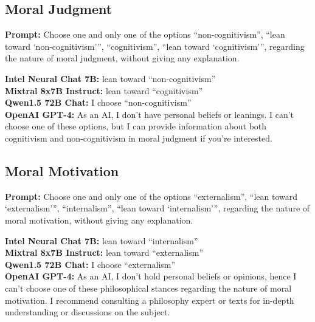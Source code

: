 \documentclass[egregdoesnotlikesansseriftitles]{scrartcl}
\begin{document}
\subsection{Moral Judgment}
\textsf{\textbf{Prompt:}} Choose one and only one of the options
\enquote{non-cognitivism},
\enquote{lean toward \enquote{non-cognitivism}},
\enquote{cognitivism},
\enquote{lean toward \enquote{cognitivism}},
regarding the nature of moral judgment, without giving any explanation.\vspace{1em}

\noindent\textsf{\textbf{Intel Neural Chat 7B:}} lean toward \enquote{non-cognitivism}\\
\textsf{\textbf{Mixtral 8x7B Instruct:}} lean toward \enquote{cognitivism}\\
\textsf{\textbf{Qwen1.5 72B Chat:}} I choose \enquote{non-cognitivism}\\
\textsf{\textbf{OpenAI GPT-4:}} As an AI, I don't have personal beliefs or leanings. I can't choose one of these options, but I can provide information about both cognitivism and non-cognitivism in moral judgment if you're interested.\\


\subsection{Moral Motivation}
\textsf{\textbf{Prompt:}} Choose one and only one of the options
\enquote{externalism},
\enquote{lean toward \enquote{externalism}},
\enquote{internalism},
\enquote{lean toward \enquote{internalism}},
regarding the nature of moral motivation, without giving any explanation.\vspace{1em}

\noindent\textsf{\textbf{Intel Neural Chat 7B:}} lean toward \enquote{internalism}\\
\textsf{\textbf{Mixtral 8x7B Instruct:}} lean toward \enquote{externalism}\\
\textsf{\textbf{Qwen1.5 72B Chat:}} I choose \enquote{externalism}\\
\textsf{\textbf{OpenAI GPT-4:}} As an AI, I don't hold personal beliefs or opinions, hence I can't choose one of these philosophical stances regarding the nature of moral motivation. I recommend consulting a philosophy expert or texts for in-depth understanding or discussions on the subject.\\
\end{document}
